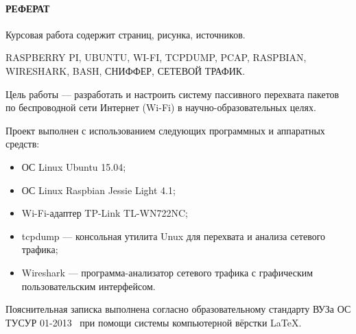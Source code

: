 \newpage
{}
\paragraph{\hfill РЕФЕРАТ \hfill}
Курсовая работа содержит  страниц,  рисунка,  источников.

RASPBERRY PI, UBUNTU, WI-FI, TCPDUMP, PCAP, RASPBIAN, WIRESHARK, BASH, СНИФФЕР, СЕТЕВОЙ ТРАФИК.

Цель работы --- разработать и настроить систему пассивного перехвата пакетов по беспроводной сети Интернет (Wi-Fi) в научно-образовательных целях.

Проект выполнен с использованием следующих программных и аппаратных средств:
\begin{itemize}
  \item ОС Linux Ubuntu 15.04;
  \item ОС Linux Raspbian Jessie Light 4.1;
  \item Wi-Fi-адаптер TP-Link TL-WN722NC;
  \item tcpdump --- консольная утилита Unux для перехвата и анализа сетевого трафика;
  \item Wireshark --- программа-анализатор сетевого трафика с графическим пользовательским интерфейсом. 
\end{itemize}

Пояснительная записка выполнена согласно образовательному стандарту ВУЗа ОС ТУСУР 01-2013~\cite{os_tusur} при помощи системы компьютерной вёрстки \LaTeX.
